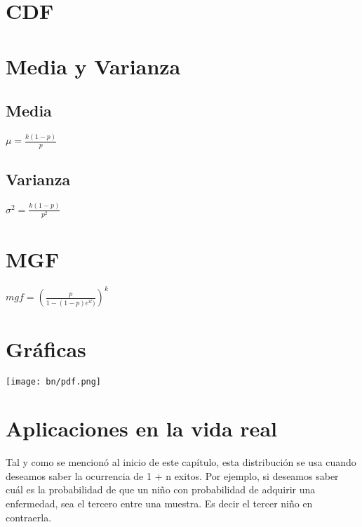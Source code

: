 \section{CDF}

\section{Media y Varianza}
\subsection{Media}
\begin{center}
$\mu = \frac{k(1-p)}{p}$
\end{center}

\subsection{Varianza}
\begin{center}
	$\sigma^2 = \frac{k(1-p)}{p ^ 2}$
\end{center}
	
\section{MGF}
\begin{center}
	$mgf = (\frac{p}{1-(1-p) \textit{e}^{it}) })^k$
\end{center}
	
\section{Gráficas}
\begin{center}
	\texttt{[image: bn/pdf.png]}
\end{center}

\section{Aplicaciones en la vida real}
Tal y como se mencionó al inicio de este capítulo, esta distribución se usa cuando deseamos saber la ocurrencia de 1 + n exitos. Por ejemplo, si deseamos saber cuál es la probabilidad de que un niño con probabilidad de adquirir una enfermedad, sea el tercero entre una muestra. Es decir el tercer niño en contraerla. 